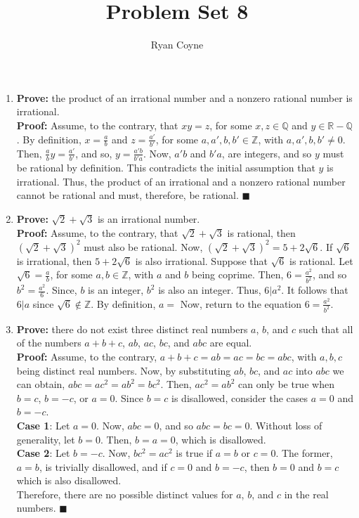 \documentclass[12pt]{article}
\newcommand{\Z}{\mathbb{Z}}
\newcommand{\R}{\mathbb{R}}
\newcommand{\Q}{\mathbb{Q}}
\newcommand{\qed}{\(\blacksquare\)}
\begin{document}
    \title{Problem Set 8}
    \author{Ryan Coyne}
    \maketitle

    \begin{enumerate}
        \item \textbf{Prove:} the product of an irrational number and a nonzero rational number is irrational.\\ \textbf{Proof:} Assume, to the contrary, that \(xy=z\), for some \(x,z\in\Q\) and \(y\in\R-\Q\). By definition, \(x=\frac{a}{b}\) and \(z=\frac{a'}{b'}\), for some \(a,a',b,b'\in\Z\), with \(a,a',b,b'\neq0\). Then, \(\frac{a}{b}y=\frac{a'}{b'}\), and so, \(y=\frac{a'b}{b'a}\). Now, \(a'b\) and \(b'a\), are integers, and so \(y\) must be rational by definition. This contradicts the initial assumption that \(y\) is irrational. Thus, the product of an irrational and a nonzero rational number cannot be rational and must, therefore, be rational. \qed
        \item \textbf{Prove:}  \(\sqrt{2}+\sqrt{3}\) is an irrational number.\\ \textbf{Proof:} Assume, to the contrary, that \(\sqrt{2}+\sqrt{3}\) is rational, then \((\sqrt{2}+\sqrt{3})^2\) must also be rational. Now, \((\sqrt{2}+\sqrt{3})^2=5+2\sqrt{6}\). If \(\sqrt{6}\) is irrational, then \(5+2\sqrt{6}\) is also irrational. Suppose that \(\sqrt{6}\) is rational. Let \(\sqrt{6}=\frac{a}{b}\), for some \(a,b\in\Z\), with \(a\) and \(b\) being coprime. Then, \(6=\frac{a^2}{b^2}\), and so \(b^2=\frac{a^2}{6}\). Since, \(b\) is an integer, \(b^2\) is also an integer. Thus, \(6|a^2\). It follows that \(6|a\) since \(\sqrt{6}\not\in\Z\). By definition, \(a=\) Now, return to the equation \(6=\frac{a^2}{b^2}\). 
        \item \textbf{Prove:} there do not exist three distinct real numbers \(a\), \(b\), and \(c\) such that all of the numbers \(a+b+c\), \(ab\), \(ac\), \(bc\), and \(abc\) are equal.\\ \textbf{Proof:} Assume, to the contrary, \(a+b+c=ab=ac=bc=abc\), with \(a,b,c\) being distinct real numbers. Now, by substituting \(ab\), \(bc\), and \(ac\) into \(abc\) we can obtain, \(abc=ac^2=ab^2=bc^2\). Then, \(ac^2=ab^2\) can only be true when \(b=c\), \(b=-c\), or \(a=0\). Since \(b=c\) is disallowed, consider the cases \(a=0\) and \(b=-c\). \\ \textbf{Case 1}: Let \(a=0\). Now, \(abc=0\), and so \(abc=bc=0\). Without loss of generality, let \(b=0\). Then, \(b=a=0\), which is disallowed.\\ \textbf{Case 2}: Let \(b=-c\). Now, \(bc^2=ac^2\) is true if \(a=b\) or \(c=0\). The former, \(a=b\), is trivially disallowed, and if \(c=0\) and \(b=-c\), then \(b=0\) and \(b=c\) which is also disallowed. \\Therefore, there are no possible distinct values for \(a\), \(b\), and \(c\) in the real numbers. \qed

\end{enumerate}
\end{document}

